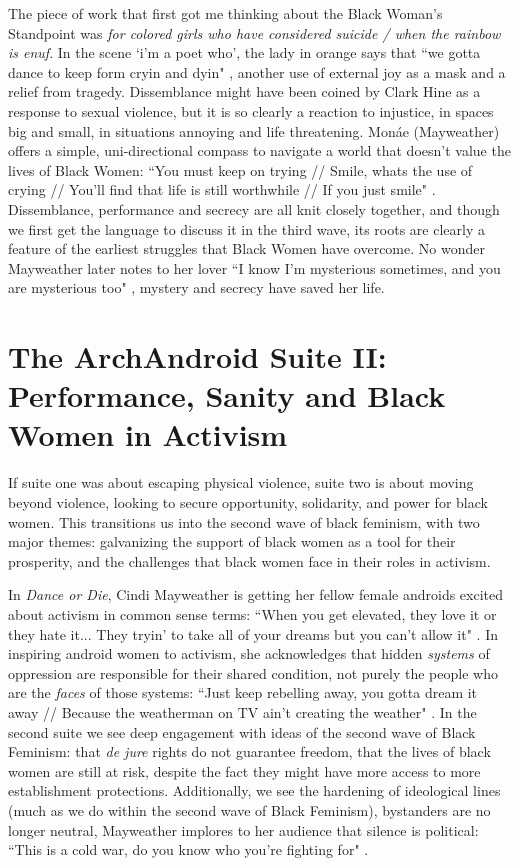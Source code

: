 \documentclass[a4paper, 11pt]{article} %
\begin{document}
The piece of work that first got me thinking about the Black Woman's Standpoint was \emph{for colored girls who have considered suicide / when the rainbow is enuf}.
In the scene `i'm a poet who', the lady in orange says that ``we gotta dance to keep form cryin and dyin" \cite{forcoloredgirls}, another use of external joy as a mask and a relief from tragedy.
Dissemblance might have been coined by Clark Hine as a response to sexual violence, but it is so clearly a reaction to injustice, in spaces big and small, in situations annoying and life threatening.
Mon\'ae (Mayweather) offers a simple, uni-directional compass to navigate a world that doesn't value the lives of Black Women:
``You must keep on trying // Smile, whats the use of crying // You'll find that life is still worthwhile // If you just smile" \cite{smile}.
Dissemblance, performance and secrecy are all knit closely together, and though we first get the language to discuss it in the third wave, its roots are clearly a feature of the earliest struggles that Black Women have overcome.
No wonder Mayweather later notes to her lover ``I know I'm mysterious sometimes, and you are mysterious too" \cite{primetime},
mystery and secrecy have saved her life.


\section*{The ArchAndroid Suite II: Performance, Sanity and Black Women in Activism}

If suite one was about escaping physical violence, suite two is about moving beyond violence, looking to secure opportunity, solidarity, and power for black women.
This transitions us into the second wave of black feminism, with two major themes: galvanizing the support of black women as a tool for their prosperity, and the challenges that black women face in their roles in activism.

In \emph{Dance or Die}, Cindi Mayweather is getting her fellow female androids excited about activism in common sense terms:
``When you get elevated, they love it or they hate it... They tryin' to take all of your dreams but you can't allow it" \cite{tightrope}.
In inspiring android women to activism, she acknowledges that hidden \emph{systems} of oppression are responsible for their shared condition, not purely the people who are the \emph{faces} of those systems:
``Just keep rebelling away, you gotta dream it away // Because the weatherman on TV ain't creating the weather" \cite{danceordie}. 
In the second suite we see deep engagement with ideas of the second wave of Black Feminism: that \emph{de jure} rights do not guarantee freedom, that the lives of black women are still at risk, despite the fact they might have more access to more establishment protections.
Additionally, we see the hardening of ideological lines (much as we do within the second wave of Black Feminism), bystanders are no longer neutral, Mayweather implores to her audience that silence is political:
``This is a cold war, do you know who you're fighting for" \cite{coldwar}.
\end{document}
